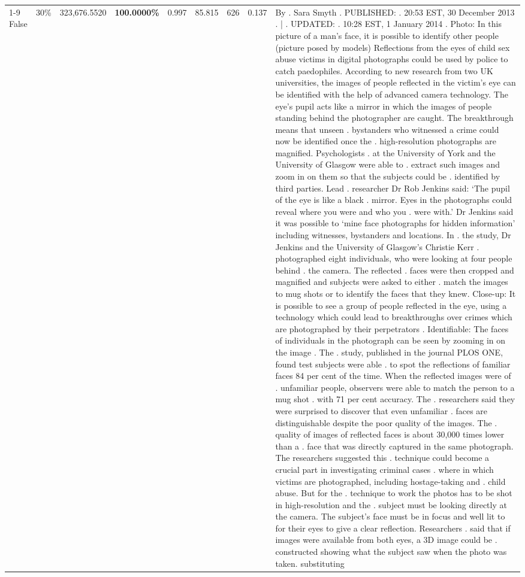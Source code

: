 \begin{table}[H]
\begin{tabular}{lllrlllll}
\cline{1-9} \cline{2-9}
False & 30\% & 323,676.5520 & \bfseries \color{red} 100.0000\% & 0.997 & 85.815 & 626 & 0.137 & By . Sara Smyth . PUBLISHED: . 20:53 EST, 30 December 2013 . | . UPDATED: . 10:28 EST, 1 January 2014 . Photo: In this picture of a man's face, it is possible to identify other people (picture posed by models) Reflections from the eyes of child sex abuse victims in digital photographs could be used by police to catch paedophiles. According to new research from two UK universities, the images of people reflected in the victim's eye can be identified with the help of advanced camera technology. The eye's pupil acts like a mirror in which the images of people standing behind the photographer are caught. The breakthrough means that unseen . bystanders who witnessed a crime could now be identified once the . high-resolution photographs are magnified. Psychologists . at the University of York and the University of Glasgow were able to . extract such images and zoom in on them so that the subjects could be . identified by third parties. Lead . researcher Dr Rob Jenkins said: ‘The pupil of the eye is like a black . mirror. Eyes in the photographs could reveal where you were and who you . were with.' Dr Jenkins said it was possible to ‘mine face photographs for hidden information' including witnesses, bystanders and locations. In . the study, Dr Jenkins and the University of Glasgow's Christie Kerr . photographed eight individuals, who were looking at four people behind . the camera. The reflected . faces were then cropped and magnified and subjects were asked to either . match the images to mug shots or to identify the faces that they knew. Close-up: It is possible to see a group of people reflected in the eye, using a technology which could lead to breakthroughs over crimes which are photographed by their perpetrators . Identifiable: The faces of individuals in the photograph can be seen by zooming in on the image . The . study, published in the journal PLOS ONE, found test subjects were able . to spot the reflections of familiar faces 84 per cent of the time. When the reflected images were of . unfamiliar people, observers were able to match the person to a mug shot . with 71 per cent accuracy. The . researchers said they were surprised to discover that even unfamiliar . faces are distinguishable despite the poor quality of the images. The . quality of images of reflected faces is about 30,000 times lower than a . face that was directly captured in the same photograph. The researchers suggested this . technique could become a crucial part in investigating criminal cases . where in which victims are photographed, including hostage-taking and . child abuse. But for the . technique to work the photos has to be shot in high-resolution and the . subject must be looking directly at the camera. The subject's face must be in focus and well lit to for their eyes to give a clear reflection. Researchers . said that if images were available from both eyes, a 3D image could be . constructed showing what the subject saw when the photo was taken. substituting \\

\end{tabular}
\end{table}
